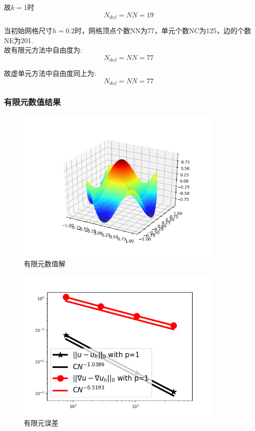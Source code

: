\documentclass[12pt]{article}
\begin{document}
\begin{CJK}{UTF8}{gkai}
         故$k=1$时\\
         \begin{equation}
         N_{dof}=NN=19   
         \end{equation} 
       
         
         
         当初始网格尺寸$h=0.2$时，网格顶点个数NN为77，单元个数NC为125，边的个数NE为201.\\
         
         故有限元方法中自由度为:\\
         \begin{equation}
         N_{dof}=NN=77
         \end{equation}
         
         故虚单元方法中自由度同上为:\\
         \begin{equation}
         N_{dof}=NN=77
         \end{equation}
         
       
       
       \subsubsection{有限元数值结果}
       \begin{figure}[H] 
       	\centering
       	\includegraphics[width=10cm]{Figure_3.png}
       	\caption{有限元数值解}
       \end{figure}
       
       \begin{figure}[H] 
       	\centering
       	\includegraphics[width=10cm]{Figure_2-1.png}
       	\caption{有限元误差}
	  \end{figure}
        

\end{CJK}
\end{document}
